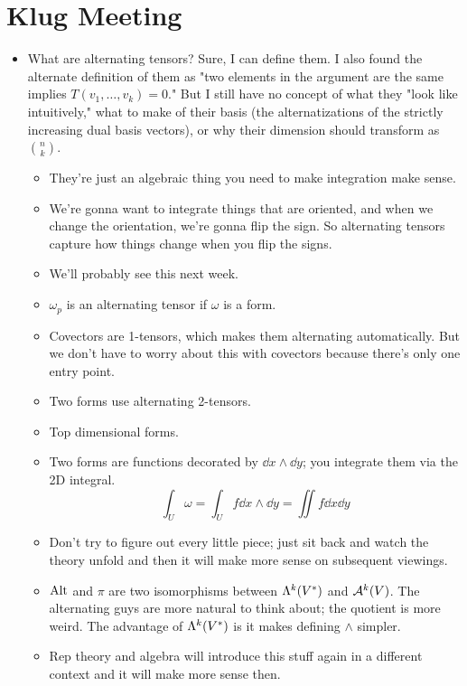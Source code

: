 \documentclass[../notes.tex]{subfiles}
\begin{document}
\section{Klug Meeting}
\begin{itemize}
    \item What are alternating tensors? Sure, I can define them. I also found the alternate definition of them as "two elements in the argument are the same implies $T(v_1,\dots,v_k)=0$." But I still have no concept of what they "look like intuitively," what to make of their basis (the alternatizations of the strictly increasing dual basis vectors), or why their dimension should transform as $\binom{n}{k}$.
    \begin{itemize}
        \item They're just an algebraic thing you need to make integration make sense.
        \item We're gonna want to integrate things that are oriented, and when we change the orientation, we're gonna flip the sign. So alternating tensors capture how things change when you flip the signs.
        \item We'll probably see this next week.
        \item $\omega_p$ is an alternating tensor if $\omega$ is a form.
        \item Covectors are 1-tensors, which makes them alternating automatically. But we don't have to worry about this with covectors because there's only one entry point.
        \item Two forms use alternating 2-tensors.
        \item Top dimensional forms.
        \item Two forms are functions decorated by $\dd{x}\wedge\dd{y}$; you integrate them via the 2D integral.
        \begin{equation*}
            \int_U\omega = \int_Uf\dd{x}\wedge\dd{y}
            = \iint f\dd{x}\dd{y}
        \end{equation*}
        \item Don't try to figure out every little piece; just sit back and watch the theory unfold and then it will make more sense on subsequent viewings.
        \item $\Alt$ and $\pi$ are two isomorphisms between $\lam[k]{V^*}$ and $\alt[k]{V}$. The alternating guys are more natural to think about; the quotient is more weird. The advantage of $\lam[k]{V^*}$ is it makes defining $\wedge$ simpler.
        \item Rep theory and algebra will introduce this stuff again in a different context and it will make more sense then.

\end{itemize}
\end{itemize}
\end{document}
